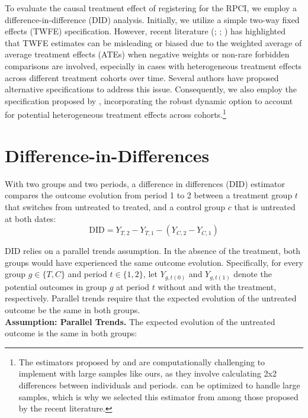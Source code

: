 \documentclass[10pt, oneside]{book}
\begin{document}
To evaluate the causal treatment effect of registering for the RPCI, we employ a difference-in-difference (DID) analysis. Initially, we utilize a simple two-way fixed effects (TWFE) specification. However, recent literature (\citealt{de2020two}; \citealt{callaway2021difference}; \citealt{sun2021estimating}) has highlighted that TWFE estimates can be misleading or biased due to the weighted average of average treatment effects (ATEs) when negative weights or non-rare forbidden comparisons are involved, especially in cases with heterogeneous treatment effects across different treatment cohorts over time. Several authors have proposed alternative specifications to address this issue. Consequently, we also employ the specification proposed by \cite{de2020two}, incorporating the robust dynamic option to account for potential heterogeneous treatment effects across cohorts.\footnote{The estimators proposed by \cite{callaway2021difference} and \cite{sun2021estimating} are computationally challenging to implement with large samples like ours, as they involve calculating 2x2 differences between individuals and periods. \cite{de2020two} can be optimized to handle large samples, which is why we selected this estimator from among those proposed by the recent literature.}  \\

\section{Difference-in-Differences}

With two groups and two periods, a difference in differences (DID) estimator compares the outcome evolution from period 1 to 2 between a treatment group $t$ that switches from untreated to treated, and a control group $c$ that is untreated at both dates: \\

$$\text{DID} = Y_{T,2} - Y_{T,1} - (Y_{C,2} - Y_{C,1})$$

DID relies on a parallel trends assumption. In the absence of the treatment, both groups would have experienced the same outcome evolution. Specifically, for every group $g \in \{T, C\}$ and period $t \in \{1, 2\}$, let $Y_{g,t(0)}$ and $Y_{g,t(1)}$ denote the potential outcomes in group $g$ at period $t$ without and with the treatment, respectively. Parallel trends require that the expected evolution of the untreated outcome be the same in both groups. \\

\textbf{Assumption: Parallel Trends.} The expected evolution of the untreated outcome is the same in both groups: 
\end{document}
